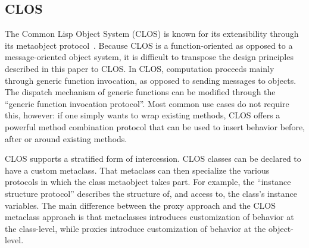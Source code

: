 \documentclass{acm_proc_article-sp}
\begin{document}



\subsection{CLOS}

The Common Lisp Object System (CLOS) is known for its extensibility through its metaobject protocol~\cite{kiczales_artmop}. Because CLOS is a function-oriented as opposed to a message-oriented object system, it is difficult to transpose the design principles described in this paper to CLOS. In CLOS, computation proceeds mainly through generic function invocation, as opposed to sending messages to objects. The dispatch mechanism of generic functions can be modified through the ``generic function invocation protocol''. Most common use cases do not require this, however: if one simply wants to wrap existing methods, CLOS offers a powerful method combination protocol that can be used to insert behavior before, after or around existing methods.

CLOS supports a stratified form of intercession. CLOS classes can be declared to have a custom metaclass. That metaclass can then specialize the various protocols in which the class metaobject takes part. For example, the ``instance structure protocol'' describes the structure of, and access to, the class's instance variables. The main difference between the proxy approach and the CLOS metaclass approach is that metaclasses introduces customization of behavior at the class-level, while proxies introduce customization of behavior at the object-level.
\end{document}
